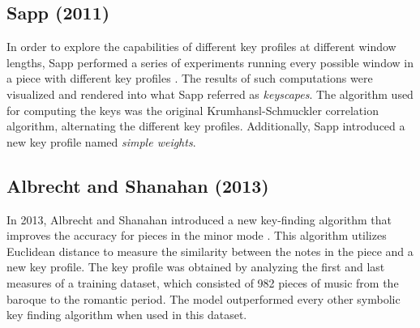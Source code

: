 

\subsection{Sapp (2011)}
In order to explore the capabilities of different key profiles at different window lengths, Sapp performed a series of experiments running every possible window in a piece with different key profiles \cite{sapp_computational_2011}. The results of such computations were visualized and rendered into what Sapp referred as \emph{keyscapes}. The algorithm used for computing the keys was the original Krumhansl-Schmuckler correlation algorithm, alternating the different key profiles. Additionally, Sapp introduced a new key profile named \emph{simple weights}. 

\subsection{Albrecht and Shanahan (2013)}
In 2013, Albrecht and Shanahan introduced a new key-finding algorithm that improves the accuracy for pieces in the minor mode \cite{albrecht_use_2013}. This algorithm utilizes Euclidean distance to measure the similarity between the notes in the piece and a new key profile. The key profile was obtained by analyzing the first and last measures of a training dataset, which consisted of 982 pieces of music from the baroque to the romantic period. The model outperformed every other symbolic key finding algorithm when used in this dataset.




